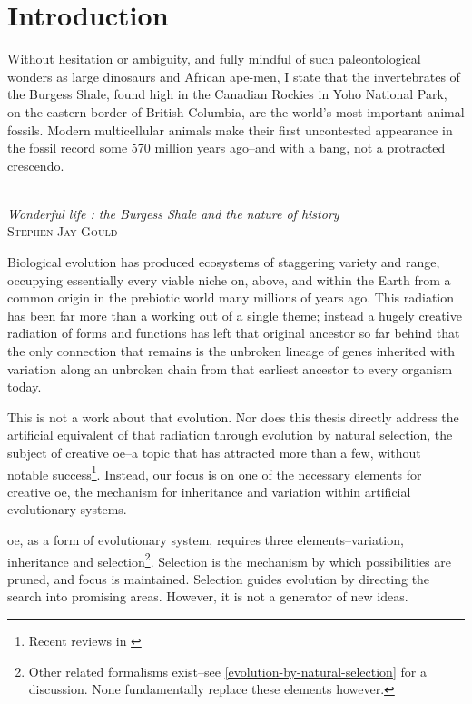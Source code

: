 \chapter{Introduction}\label{introduction}

\settowidth{\epigraphwidth}{Wonderful life : the Burgess Shale and the nature of history}
\epigraph{%
Without hesitation or ambiguity, and fully mindful of such paleontological wonders as large dinosaurs and African ape-men, I state that the invertebrates of the Burgess Shale, found high in the Canadian Rockies in Yoho National Park, on the eastern border of British Columbia, are the world's most important animal fossils. Modern multicellular animals make their first uncontested appearance in the fossil record some 570 million years ago--and with a bang, not a protracted crescendo.}%
{\textit{\\Wonderful life : the Burgess Shale and the nature of history}\\\textsc{Stephen Jay Gould}}

Biological evolution has produced ecosystems of staggering variety and range, occupying essentially every viable niche on, above, and within the Earth from a common origin in the prebiotic world many millions of years ago. This radiation has been far more than a working out of a single theme; instead a hugely creative radiation of forms and functions has left that original ancestor so far behind that the only connection that remains is the unbroken lineage of genes inherited with variation along an unbroken chain from that earliest ancestor to every organism today.

This is not a work about that evolution. Nor does this thesis directly address the artificial equivalent of that radiation through evolution by natural selection, the subject of creative \gls{oe}--a topic that has attracted more than a few, without notable success\footnote{Recent reviews in \cite{BanzhafBaumgaertnerBeslonEtAl2016}}. Instead, our focus is on one of the necessary elements for creative \gls{oe}, the mechanism for inheritance and variation within artificial evolutionary systems.

\Gls{oe}, as a form of evolutionary system, requires three elements--variation, inheritance and selection\footnote{Other related formalisms exist--see \cref{evolution-by-natural-selection} for a discussion. None fundamentally replace these elements however.}. Selection is the mechanism by which possibilities are pruned, and focus is maintained. Selection guides evolution by directing the search into promising areas. However, it is not a generator of new ideas. 


